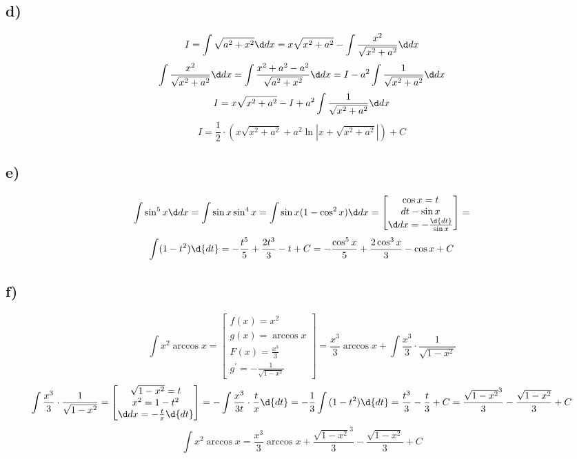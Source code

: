 	 	\subsection*{d)}
	 	$$I = \int\sqrt{a^2+x^2}\dx = x\sqrt{x^2+a^2}-\int\frac{x^2}{\sqrt{x^2+a^2}}\dx$$
	 	$$\int\frac{x^2}{\sqrt{x^2+a^2}}\dx = \int\frac{x^2+a^2-a^2}{\sqrt{a^2+x^2}}\dx = I -a^2\int\frac{1}{\sqrt{x^2+a^2}}\dx $$
	 	$$I = x\sqrt{x^2+a^2}-I +a^2\int\frac{1}{\sqrt{x^2+a^2}}\dx  $$
	 	$$I = \frac{1}{2}\cdot\left(x\sqrt{x^2+a^2} + a^2\ln{|x+\sqrt{x^2+a^2}|}\right)+C$$
	 	\subsection*{e)}
	 	$$\int\sin^5x\dx = \int \sin x\sin^4x = \int \sin x (1-\cos^2x)\dx  = \begin{bmatrix}\cos x = t \\
	 	dt -\sin x \\
	 	\dx = -\frac{\d{dt}}{\sin x}\end{bmatrix} = $$
	 	$$\int (1-t^2)\d{dt} = -\frac{t^5}{5}+\frac{2t^3}{3}- t+ C = -\frac{\cos^5x}{5}+\frac{2\cos^3x}{3}- \cos x+ C $$
	 	\subsection*{f)}
	 	$$\int x^2\arccos x = \begin{bmatrix}
	 		f(x) = x^2 \\
	 		g(x) = \arccos x \\
	 		F(x) = \frac{x^3}{3} \\
	 		g^{'} = -\frac{1}{\sqrt{1-x^2}}
	 	\end{bmatrix} = \frac{x^3}{3}\arccos x + \int\frac{x^3}{3}\cdot\frac{1}{\sqrt{1-x^2}}$$
	 	$$\int\frac{x^3}{3}\cdot\frac{1}{\sqrt{1-x^2}} = \begin{bmatrix}
	 		\sqrt{1-x^2} = t \\
	 		x^2 = 1-t^2 \\
	 		\dx = -\frac{t}{x}\d{dt}
	 	\end{bmatrix} = -\int\frac{x^3}{3t}\cdot\frac{t}{x}\d{dt} = -\frac13\int{(1-t^2)\d{dt}} = \frac{t^3}{3}-\frac{t}{3}+ C = \frac{\sqrt{1-x^2}^3}{3}-\frac{\sqrt{1-x^2}}{3}+ C$$
	 	$$\int x^2\arccos x = \frac{x^3}{3}\arccos x +\frac{\sqrt{1-x^2}^3}{3}-\frac{\sqrt{1-x^2}}{3}+ C $$
